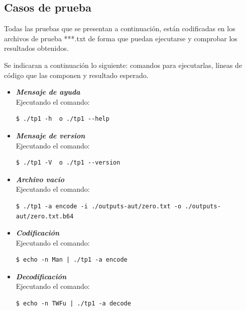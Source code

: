 \documentclass[11pt,a4paper]{article}
\begin{document}
\subsection{Casos de prueba}

Todas las pruebas que se presentan a continuación, están codificadas en los archivos de prueba ***.txt de forma que puedan ejecutarse y comprobar los resultados obtenidos.

Se indicaran a continuación lo siguiente: comandos para ejecutarlas, líneas de código que las componen y resultado esperado.

\begin{itemize}

	\item \textit{\textbf{Mensaje de ayuda}}\\
	Ejecutando el comando:
	\begin{lstlisting}
$ ./tp1 -h  o ./tp1 --help
	\end{lstlisting}
      
     
	\item \textit{\textbf{Mensaje de version}}\\
	Ejecutando el comando:
	\begin{lstlisting}
$ ./tp1 -V  o ./tp1 --version
	\end{lstlisting}  
 

	\item \textit{\textbf{Archivo vacío}}\\
	Ejecutando el comando:
	\begin{lstlisting}
$ ./tp1 -a encode -i ./outputs-aut/zero.txt -o ./outputs-aut/zero.txt.b64
	\end{lstlisting}  


	\item \textit{\textbf{Codificación}}\\
	Ejecutando el comando:
	\begin{lstlisting}
$ echo -n Man | ./tp1 -a encode
	\end{lstlisting}  
 

	\item \textit{\textbf{Decodificación}}\\
	Ejecutando el comando:
	\begin{lstlisting}
$ echo -n TWFu | ./tp1 -a decode
	\end{lstlisting}  
  


\end{itemize}
\end{document}
